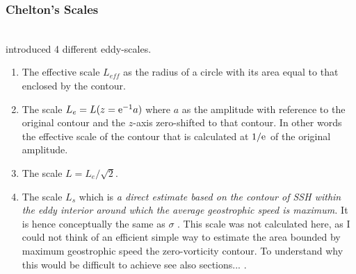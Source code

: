 \subsubsection{Chelton's Scales} \label{filter:chstuff}
\\
\cite{chelton2011} introduced 4 different eddy-scales.
\begin{enumerate}
	\item
	The effective scale $L_{eff}$ as the radius of a circle with its area equal to that enclosed by the contour.
	\item
	The scale $L_e  = L(z=\mathrm{e}^{-1} a)$ where $a$ as the amplitude with reference to the original contour and the $z$-axis zero-shifted to that contour. In other words the effective scale of the contour that is calculated at $1/\mathrm{e}^{}$ of the original amplitude.
	\item
	The scale $L=L_e/\sqrt{2}$.
	\item
	The scale $L_s$ which is \textit{a direct estimate based on the contour of SSH within the eddy interior around which the average geostrophic speed is maximum.} \citep{chelton2011} It is hence conceptually the same as $\sigma$ . This scale was not calculated here, as I could not think of an efficient simple way to estimate the area bounded by maximum geostrophic speed \ie the zero-vorticity contour. To understand why this would be difficult to achieve see also sections... .
\end{enumerate}
